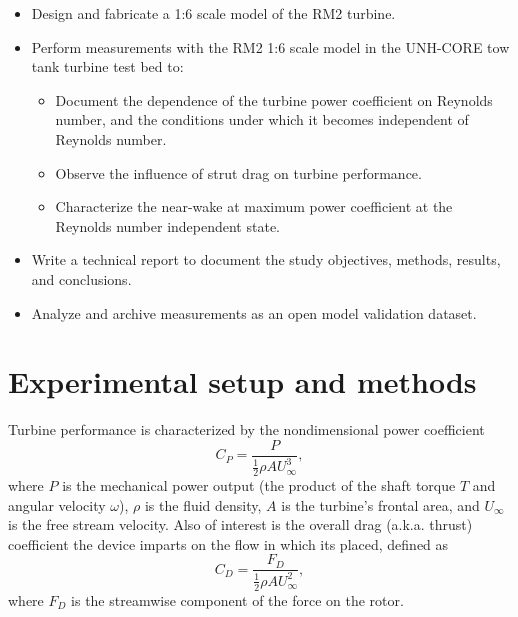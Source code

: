 \documentclass[12pt,letterpaper]{scrreprt}
\begin{document}
\begin{itemize}
	\item Design and fabricate a 1:6 scale model of the RM2 turbine.

	\item Perform measurements with the RM2 1:6 scale model in the UNH-CORE tow
	tank turbine test bed to:

	\begin{itemize}

		\item Document the dependence of the turbine power coefficient on Reynolds
		number, and the conditions under which it becomes independent of Reynolds number.
		
		\item Observe the influence of strut drag on turbine performance.
		
		\item Characterize the near-wake at maximum power coefficient at the Reynolds
		number independent state.

	\end{itemize}

	\item Write a technical report to document the study objectives, methods,
	results, and conclusions.
	
	\item Analyze and archive measurements as an open model validation dataset.
\end{itemize}

\chapter{Experimental setup and methods}

Turbine performance is characterized by the nondimensional power coefficient
\begin{equation}
C_P = \frac{P}{\frac{1}{2} \rho A U_\infty^3},
\label{eq-cp}
\end{equation}
where $P$ is the mechanical power output (the product of the shaft torque $T$
and angular velocity $\omega$), $\rho$ is the fluid density, $A$ is the
turbine's frontal area, and $U_\infty$ is the free stream velocity. Also of
interest is the overall drag (a.k.a. thrust) coefficient the device imparts on
the flow in which its placed, defined as
\begin{equation}
C_D = \frac{F_D}{\frac{1}{2} \rho A U_\infty^2},
\label{eq-cd}
\end{equation}
where $F_D$ is the streamwise component of the force on the rotor.
\end{document}
